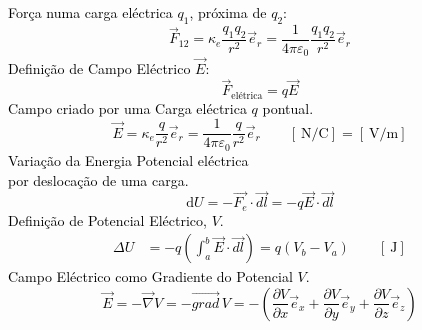 \documentclass[a4paper,10pt]{extarticle} %
\newcommand{\mybox}[2]{
    \begin{tcolorbox}[colback=lightblue!5!white,colframe=lightblue!75!black,boxsep=1pt,arc=0pt,outer arc=0pt,title={\textcolor{black}{#1}}]
        \textcolor{black}{#2}
    \end{tcolorbox}
}
\begin{document}
\begin{multicols}{2}

    \mybox{Electrostática}{
        Força numa carga eléctrica $q_1$, próxima de $q_2$:
        \begin{equation}
            \vec{F}_{12}  = \kappa_e \frac{q_1 q_2}{r^2}\vec{e}_{r} = \frac{1}{4\pi\varepsilon_0}\frac{q_1 q_2}{r^2}\vec{e}_{r}
        \end{equation}
        Definição de Campo  Eléctrico \(\vec{E} \):
        \begin{equation}
            \vec{F}_{\text{elétrica}} = q\vec{E}
        \end{equation}
        Campo criado por uma Carga eléctrica \(q\) pontual.
        \begin{equation}
            \vec{E}  = \kappa_e \frac{q}{r^2}\vec{e}_{r} = \frac{1}{4\pi\varepsilon_0}\frac{q}{r^2}\vec{e}_{r} \qquad [\SI{}{\newton\per\coulomb}]=[\SI{}{\volt\per\meter}] 
        \end{equation}
        Variação da Energia Potencial eléctrica\\ 
        por deslocação de uma carga.
        \begin{equation}
            \mathrm{d}U = -\vec{F_e} \cdot \vec{dl} = -q \vec{E} \cdot \vec{dl} 
        \end{equation}
         Definição de Potencial Eléctrico, \(V\).
        \begin{subequations}
            \begin{align}
                \Delta U &= -q (\int_a^b \vec{E} \cdot \vec{dl} )  = q ( V_b - V_a) \qquad [\SI{}{\joule}]
            \end{align}
        \end{subequations}
        Campo Eléctrico como Gradiente do  Potencial \(V\).
        \begin{equation}
            \vec{E} =- \vec{\nabla} V = - \vec{grad}\, V = -\left( 
            \frac{\partial V}{\partial x}\vec{e}_x + 
            \frac{\partial V}{\partial y}\vec{e}_y + 
            \frac{\partial V}{\partial z}\vec{e}_z   \right) 
        \end{equation}
}
\end{multicols}
\end{document}
